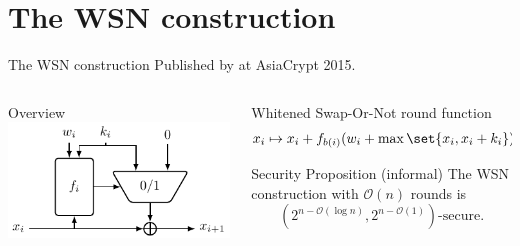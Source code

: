 \section{The WSN construction}
\begin{frame}{The WSN construction}
    \centering
    Published by \textcite{AC:Tessaro15} at AsiaCrypt 2015.
    \begin{columns}
        \begin{column}{0.49\textwidth}
            \begin{block}{Overview\vpPp}
                \centering
                \vspace*{13pt}
                \includegraphics{data/wsn}
                \vspace*{13pt}
            \end{block}
        \end{column}
        \begin{column}{0.49\textwidth}
            \begin{block}{Whitened Swap-Or-Not round function}
                \vspace*{-10pt}
                \begin{equation*}
                    x_i \mapsto x_i + f_{b(i)}(w_i + \max \set{x_i, x_i + k_i}) \cdot k_i
                \end{equation*}
            \end{block}

            \begin{block}{Security Proposition (informal)}
                The WSN construction with $\mathcal{O}(n)$ rounds is
                \begin{equation*}
                    (2^{n-\mathcal{O}(\log n)}, 2^{n-\mathcal{O}(1)})\text{-secure}.
                \end{equation*}
            \end{block}
        \end{column}
    \end{columns}
\end{frame}

